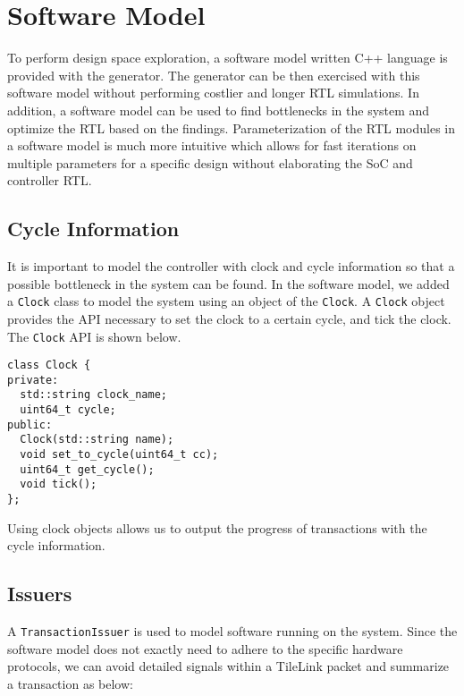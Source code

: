 \chapter{Software Model}
To perform design space exploration, a software model written C++ language is provided with the generator. The generator can be then exercised with this software model without performing costlier and longer RTL simulations. In addition, a software model can be used to find bottlenecks in the system and optimize the RTL based on the findings. Parameterization of the RTL modules in a software model is much more intuitive which allows for fast iterations on multiple parameters for a specific design without elaborating the SoC and controller RTL. 
\section{Cycle Information}
It is important to model the controller with clock and cycle information so that a possible bottleneck in the system can be found. In the software model, we added a \verb|Clock| class to model the system using an object of the \verb|Clock|. A \verb|Clock| object provides the API necessary to set the clock to a certain cycle, and tick the clock. The \verb|Clock| API is shown below.
\begin{verbatim}
class Clock {
private:
  std::string clock_name;
  uint64_t cycle;
public:
  Clock(std::string name);
  void set_to_cycle(uint64_t cc);
  uint64_t get_cycle();
  void tick();
};
\end{verbatim}
Using clock objects allows us to output the progress of transactions with the cycle information.
\section{Issuers}
A \verb|TransactionIssuer| is used to model software running on the system. Since the software model does not exactly need to adhere to the specific hardware protocols, we can avoid detailed signals within a TileLink packet and summarize a transaction as below:


